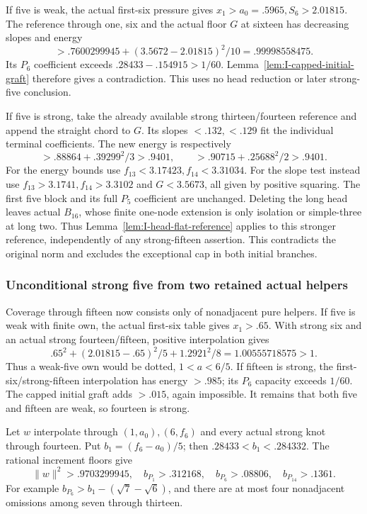 \documentclass[11pt]{article}
\theoremstyle{definition}
\theoremstyle{remark}
\newcommand{\norm}[1]{\lVert #1\rVert}
\begin{document}
If five is weak, the actual first-six pressure gives
\(x_1>a_0=.5965,S_6>2.01815\).
The reference through one, six and the actual floor \(G\) at sixteen
has decreasing slopes and energy
\[
 >.7600299945+(3.5672-2.01815)^2/10
 =.99998558475.
\]
Its \(P_6\) coefficient exceeds \(.28433-.154915>1/60\).
Lemma~\ref{lem:I-capped-initial-graft} therefore gives a contradiction.
This uses no head reduction or later strong-five conclusion.

If five is strong, take the already available strong thirteen/fourteen
reference and append the straight chord to \(G\). Its slopes
\(<.132,<.129\) fit the individual terminal coefficients.
The new energy is respectively
\[
 >.88864+.39299^2/3>.9401,\qquad
 >.90715+.25688^2/2>.9401.
\]
For the energy bounds use \(f_{13}<3.17423,f_{14}<3.31034\).
For the slope test instead use \(f_{13}>3.1741,f_{14}>3.3102\)
and \(G<3.5673\), all given by positive squaring.
The first five block and its full \(P_5\) coefficient are unchanged.
Deleting the long head leaves actual \(B_{16}\), whose finite
one-node extension is only isolation or simple-three at long two.
Thus Lemma~\ref{lem:I-head-flat-reference} applies to this stronger
reference, independently of any strong-fifteen assertion.
This contradicts the original norm and excludes the exceptional cap
in both initial branches.

\subsubsection{Unconditional strong five from two retained actual helpers}
Coverage through fifteen now consists only of nonadjacent pure helpers.
If five is weak with finite own, the actual first-six table gives
\(x_1>.65\). With strong six and an actual strong fourteen/fifteen,
positive interpolation gives
\[
 .65^2+(2.01815-.65)^2/5+1.2921^2/8
 =1.00555718575>1.
\]
Thus a weak-five own would be dotted, \(1<a<6/5\).
If fifteen is strong, the first-six/strong-fifteen interpolation has
energy \(>.985\); its \(P_6\) capacity exceeds \(1/60\).
The capped initial graft adds \(>.015\), again impossible.
It remains that both five and fifteen are weak, so fourteen is strong.

Let \(w\) interpolate through \((1,a_0),(6,f_6)\) and every
actual strong knot through fourteen. Put \(b_1=(f_6-a_0)/5\);
then \(.28433<b_1<.284332\). The rational increment floors give
\[
 \norm w^2>.9703299945,\quad
 b_{P_1}>.312168,\quad b_{P_6}>.08806,\quad b_{P_{14}}>.1361.
\]
For example \(b_{P_6}>b_1-(\sqrt7-\sqrt6)\), and there are
at most four nonadjacent omissions among seven through thirteen.
\end{document}
